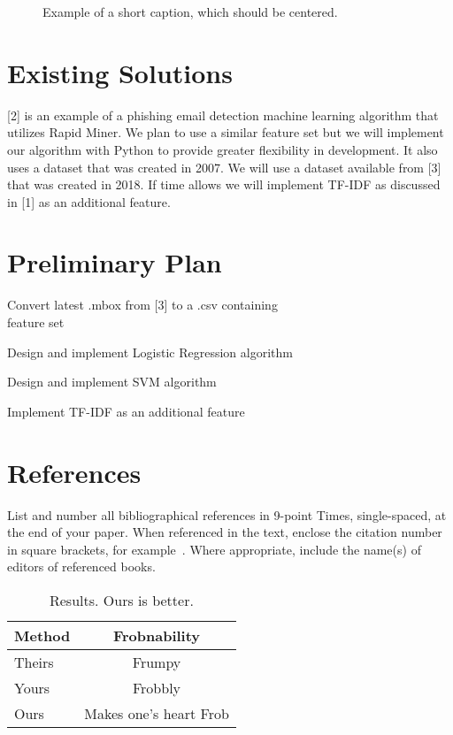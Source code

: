 \documentclass[10pt,twocolumn,letterpaper]{article}
\begin{document}
\begin{figure*}
\begin{center}
\fbox{\rule{0pt}{2in} \rule{.9\linewidth}{0pt}}
\end{center}
   \caption{Example of a short caption, which should be centered.}
\label{fig:short}
\end{figure*}

\section{Existing Solutions}

[2] is an example of a phishing email detection machine learning algorithm that utilizes Rapid Miner. We plan to use a similar feature set but we will implement our algorithm with Python to provide greater flexibility in development. It also uses a dataset that was created in 2007. We will use a dataset available from [3] that was created in 2018. If time allows we will implement TF-IDF as discussed in [1] as an additional feature.


\section{Preliminary Plan}

\begin{description}
\item Convert latest .mbox from [3] to a .csv containing \\feature set
\item Design and implement Logistic Regression algorithm
\item Design and implement SVM algorithm    
\item Implement TF-IDF as an additional feature
\end{description}

\section{References}

List and number all bibliographical references in 9-point Times,
single-spaced, at the end of your paper. When referenced in the text,
enclose the citation number in square brackets, for
example~\cite{Authors14}.  Where appropriate, include the name(s) of
editors of referenced books.

\begin{table}
\begin{center}
\begin{tabular}{|l|c|}
\hline
Method & Frobnability \\
\hline\hline
Theirs & Frumpy \\
Yours & Frobbly \\
Ours & Makes one's heart Frob\\
\hline
\end{tabular}
\end{center}
\caption{Results.   Ours is better.}
\end{table}


{\small


}
\end{document}
